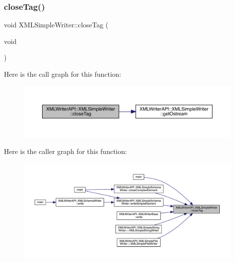 \subsubsection{\texorpdfstring{closeTag()}{closeTag()}\hspace{0.1cm}{\footnotesize\ttfamily [1/3]}}
{\footnotesize\ttfamily void X\+M\+L\+Simple\+Writer\+::close\+Tag (\begin{DoxyParamCaption}\item[{void}]{ }\end{DoxyParamCaption})}

Here is the call graph for this function\+:
\nopagebreak
\begin{figure}[H]
\begin{center}
\leavevmode
\includegraphics[width=350pt]{d5/de1/classXMLWriterAPI_1_1XMLSimpleWriter_a824d840afc871a81114406844810e958_cgraph}
\end{center}
\end{figure}
Here is the caller graph for this function\+:
\nopagebreak
\begin{figure}[H]
\begin{center}
\leavevmode
\includegraphics[width=350pt]{d5/de1/classXMLWriterAPI_1_1XMLSimpleWriter_a824d840afc871a81114406844810e958_icgraph}
\end{center}
\end{figure}
\mbox{\label{classXMLWriterAPI_1_1XMLSimpleWriter_a29af28d2a197f00ad568f39304ecdbe5}} 

